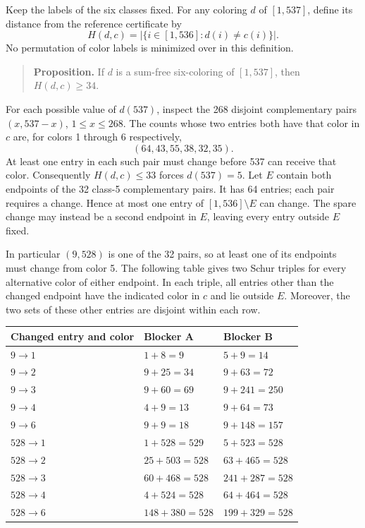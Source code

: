 \documentclass[11pt,a4paper]{article}
\begin{document}
Keep the labels of the six classes fixed. For any coloring $d$ of $[1,537]$, define its distance from the reference certificate by
\[
H(d,c)=\bigl|\{i\in[1,536]:d(i)\neq c(i)\}\bigr|.
\]
No permutation of color labels is minimized over in this definition.

\begin{quote}
\textbf{Proposition.} If $d$ is a sum-free six-coloring of $[1,537]$, then $H(d,c)\geq34$.
\end{quote}

For each possible value of $d(537)$, inspect the 268 disjoint complementary pairs $(x,537-x)$, $1\leq x\leq268$. The counts whose two entries both have that color in $c$ are, for colors 1 through 6 respectively,
\[
(64,43,55,38,32,35).
\]
At least one entry in each such pair must change before 537 can receive that color. Consequently $H(d,c)\leq33$ forces $d(537)=5$. Let $E$ contain both endpoints of the 32 class-5 complementary pairs. It has 64 entries; each pair requires a change. Hence at most one entry of $[1,536]\setminus E$ can change. The spare change may instead be a second endpoint in $E$, leaving every entry outside $E$ fixed.

In particular $(9,528)$ is one of the 32 pairs, so at least one of its endpoints must change from color 5. The following table gives two Schur triples for every alternative color of either endpoint. In each triple, all entries other than the changed endpoint have the indicated color in $c$ and lie outside $E$. Moreover, the two sets of these other entries are disjoint within each row.

\begin{center}
\begin{tabular}{@{}lll@{}}
\toprule
Changed entry and color & Blocker A & Blocker B\\
\midrule
$9\to1$ & $1+8=9$ & $5+9=14$\\
$9\to2$ & $9+25=34$ & $9+63=72$\\
$9\to3$ & $9+60=69$ & $9+241=250$\\
$9\to4$ & $4+9=13$ & $9+64=73$\\
$9\to6$ & $9+9=18$ & $9+148=157$\\
$528\to1$ & $1+528=529$ & $5+523=528$\\
$528\to2$ & $25+503=528$ & $63+465=528$\\
$528\to3$ & $60+468=528$ & $241+287=528$\\
$528\to4$ & $4+524=528$ & $64+464=528$\\
$528\to6$ & $148+380=528$ & $199+329=528$\\
\bottomrule
\end{tabular}
\end{center}
\end{document}
